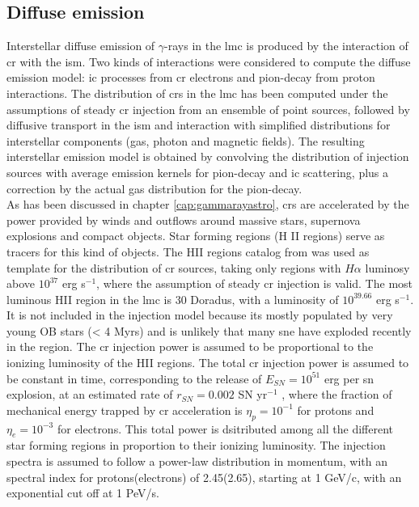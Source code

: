 \documentclass[main.tex]{subfiles}
\begin{document}
\subsection{Diffuse emission} \label{sec:diffusemodel}
Interstellar diffuse emission of $\gamma$-rays in the \gls{lmc} is produced by the interaction of \gls{cr} with the \gls{ism}. Two kinds of interactions were considered to compute the diffuse emission model: \gls{ic} processes from \gls{cr} electrons and pion-decay from proton interactions. The distribution of \glspl{cr} in the \gls{lmc} has been computed under the assumptions of steady \gls{cr} injection from an ensemble of point sources, followed by diffusive transport in the \gls{ism} and interaction with simplified distributions for interstellar components (gas, photon and magnetic fields). The resulting interstellar emission model is obtained by convolving the distribution of injection sources with average emission kernels for pion-decay and \gls{ic} scattering, plus a correction by the actual gas distribution for the pion-decay.\\
As has been discussed in chapter \ref{cap:gammarayastro}, \glspl{cr} are accelerated by the power provided by winds and outflows around massive stars, supernova explosions and compact objects. Star forming regions (H II regions) serve as tracers for this kind of objects. The HII regions catalog from \cite{2012HIIinLMC} was used as template for the distribution of \gls{cr} sources, taking only regions with $H\alpha$ luminosy above $10^{37}$ erg s$^{-1}$, where the assumption of steady \gls{cr} injection is valid. The most luminous HII region in the \gls{lmc} is 30 Doradus, with a luminosity of $10^{39.66}$ erg s$^{-1}$. It is not included in the injection model because its mostly populated by very young OB stars (< 4 Myrs) \cite{201130Doradusstarforming} and is unlikely that many \gls{sne} have exploded recently in the region. The \gls{cr} injection power is assumed to be proportional to the ionizing luminosity of the HII regions. The total \gls{cr} injection power is assumed to be constant in time, corresponding to the release of $E_{SN} = 10^{51}$ erg per \gls{sn} explosion, at an estimated rate of $r_{SN} =  0.002$ SN yr$^{-1}$ \cite{1991SNrates}, where the fraction of mechanical energy trapped by \gls{cr} acceleration is $\eta_{p} = 10^{-1}$ for protons and $\eta_{e} = 10^{-3}$ for electrons. This total power is dsitributed among all the different star forming regions in proportion to their ionizing luminosity.
The injection spectra is assumed to follow a power-law distribution in momentum, with an spectral index for protons(electrons) of 2.45(2.65), starting at 1 GeV/c, with an exponential cut off at 1 PeV/s.\\
\end{document}

